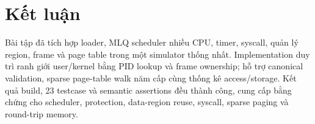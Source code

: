 \documentclass[12pt,a4paper]{article}
\begin{document}
\section{Kết luận}
Bài tập đã tích hợp loader, MLQ scheduler nhiều CPU, timer, syscall, quản lý region,
frame và page table trong một simulator thống nhất. Implementation duy trì ranh giới
user/kernel bằng PID lookup và frame ownership; hỗ trợ canonical validation, sparse
page-table walk năm cấp cùng thống kê access/storage. Kết quả build, 23 testcase và
semantic assertions đều thành công, cung cấp bằng chứng cho scheduler, protection,
data-region reuse, syscall, sparse paging và round-trip memory.
\end{document}
